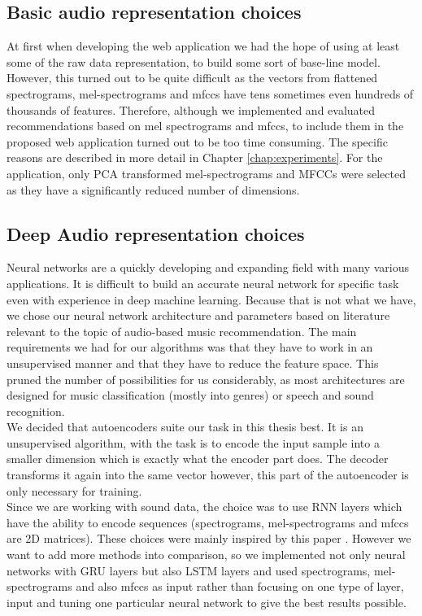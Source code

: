 \subsection{Basic audio representation choices}
At first when developing the web application we had the hope of using at least some of the raw data representation, to build some sort of base-line model. However, this turned out to be quite difficult as the vectors from flattened spectrograms, mel-spectrograms and mfccs have tens sometimes even hundreds of thousands of features. Therefore, although we implemented and evaluated recommendations based on mel spectrograms and mfccs, to include them in the proposed web application turned out to be too time consuming. The specific reasons are described in more detail in Chapter \ref{chap:experiments}. For the application, only PCA transformed mel-spectrograms and MFCCs were selected as they have a significantly reduced number of dimensions.


\subsection{Deep Audio representation choices}
Neural networks are a quickly developing and expanding field with many various applications. It is difficult to build an accurate neural network for specific task even with experience in deep machine learning. Because that is not what we have, we chose our neural network architecture and parameters based on literature relevant to the topic of audio-based music recommendation. The main requirements we had for our algorithms was that they have to work in an unsupervised manner and that they have to reduce the feature space. This pruned the number of possibilities for us considerably, as most architectures are designed for music classification (mostly into genres) or speech and sound recognition. \\
We decided that autoencoders suite our task in this thesis best. It is an unsupervised algorithm, with the task is to encode the input sample into a smaller dimension which is exactly what the encoder part does. The decoder transforms it again into the same vector however, this part of the autoencoder is only necessary for training.\\
Since we are working with sound data, the choice was to use RNN layers which have the ability to encode sequences (spectrograms, mel-spectrograms and mfccs are 2D matrices). These choices were mainly inspired by this paper \cite{inproceedings_RNNs}. However we want to add more methods into comparison, so we implemented not only neural networks with GRU layers but also LSTM layers and used spectrograms, mel-spectrograms and also mfccs as input rather than focusing on one type of layer, input and tuning one particular neural network to give the best results possible. 